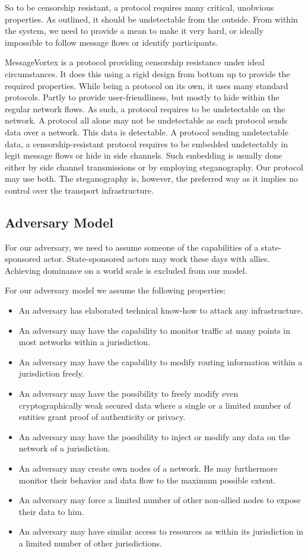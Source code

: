\documentclass[10pt,journal,compsoc]{IEEEtran}
\begin{document}
So to be censorship resistant, a protocol requires many critical, unobvious properties. As outlined, it should be undetectable from the outside. From within the system, we need to provide a mean to make it very hard, or ideally impossible to follow message flows or identify participants.

MessageVortex is a protocol providing censorship resistance under ideal circumstances. It does this using a rigid design from bottom up to provide the required properties. While being a protocol on its own, it uses many standard protocols. Partly to provide user-friendliness, but mostly to hide within the regular network flows. As such, a protocol requires to be undetectable on the network. A protocol all alone may not be undetectable as each protocol sends data over a network. This data is detectable. A protocol sending undetectable data, a censorship-resistant protocol requires to be embedded undetectably in legit message flows or hide in side channels. Such embedding is usually done either by side channel transmissions or by employing steganography. Our protocol may use both. The steganography is, however, the preferred way as it implies no control over the transport infrastructure.

\subsection{Adversary Model}
For our adversary, we need to assume someone of the capabilities of a state-sponsored actor. State-sponsored actors may work these days with allies. Achieving dominance on a world scale is excluded from our model.

For our adversary model we assume the following properties:
\begin{itemize}
	\item An adversary has elaborated technical know-how to attack any infrastructure.
	\item An adversary may have the capability to monitor traffic at many points in most networks within a jurisdiction.
	\item An adversary may have the capability to modify routing information within a jurisdiction freely.
	\item An adversary may have the possibility to freely modify even cryptographically weak secured data where a single or a limited number of entities grant proof of authenticity or privacy.
	\item An adversary may have the possibility to inject or modify any data on the network of a jurisdiction.
	\item An adversary may create own nodes of a network. He may furthermore monitor their behavior and data flow to the maximum possible extent.
	\item An adversary may force a limited number of other non-allied nodes to expose their data to him.
	\item An adversary may have similar access to resources as within its jurisdiction in a limited number of other jurisdictions.
\end{itemize}
\end{document}

